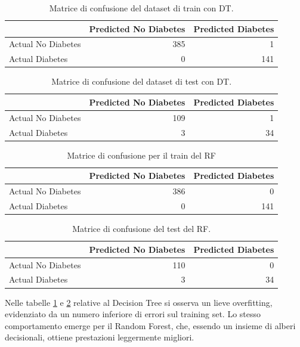 \documentclass[conference]{IEEEtran}
\begin{document}
\begin{table}[H]
\centering
\small
\begin{tabular}{lrr}
\toprule
 & Predicted No Diabetes & Predicted Diabetes \\
\midrule
Actual No Diabetes & 385 & 1 \\
Actual Diabetes & 0 & 141 \\
\bottomrule
\end{tabular}
\caption{Matrice di confusione del dataset di train con DT.}
\label{tab:DT_CF_TRAIN}
\end{table}


\begin{table}[H]
\centering
\small
\begin{tabular}{lrr}
\toprule
 & Predicted No Diabetes & Predicted Diabetes \\
\midrule
Actual No Diabetes & 109 & 1 \\
Actual Diabetes & 3 & 34 \\
\bottomrule
\end{tabular}
\caption{Matrice di confusione del dataset di test con DT.}
\label{tab:DT_CF_TEST}
\end{table}

\begin{table}[H]
\centering
\small
\begin{tabular}{lrr}
\toprule
 & Predicted No Diabetes & Predicted Diabetes \\
\midrule
Actual No Diabetes & 386 & 0 \\
Actual Diabetes & 0 & 141 \\
\bottomrule
\end{tabular}
\caption{Matrice di confusione per il train del RF}
\label{tab:RF_CF_TRAIN}
\end{table}

\begin{table}[H]
\centering
\small
\begin{tabular}{lrr}
\toprule
 & Predicted No Diabetes & Predicted Diabetes \\
\midrule
Actual No Diabetes & 110 & 0 \\
Actual Diabetes & 3 & 34 \\
\bottomrule
\end{tabular}
\caption{Matrice di confusione del test del RF.}
\label{tab:RF_CF_TEST}
\end{table}
Nelle tabelle \ref{tab:DT_CF_TRAIN} e \ref{tab:DT_CF_TEST} relative al Decision Tree si osserva un lieve overfitting, evidenziato da un numero inferiore di errori sul training set. Lo stesso comportamento emerge per il Random Forest, che, essendo un insieme di alberi decisionali, ottiene prestazioni leggermente migliori.
\end{document}
